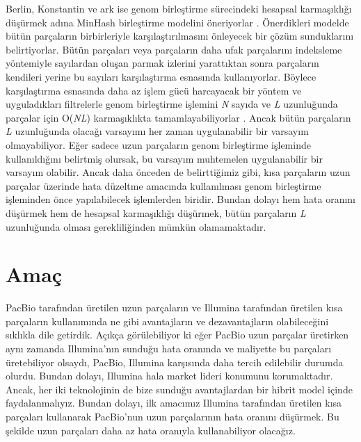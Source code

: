 Berlin, Konstantin ve ark ise genom birleştirme sürecindeki hesapsal karmaşıklığı düşürmek adına MinHash birleştirme modelini öneriyorlar \cite{Berlin2015}. Önerdikleri modelde bütün parçaların birbirleriyle karşılaştırılmasını önleyecek bir çözüm sunduklarını belirtiyorlar. Bütün parçaları veya parçaların daha ufak parçalarını indeksleme yöntemiyle sayılardan oluşan parmak izlerini yarattıktan sonra parçaların kendileri yerine bu sayıları karşılaştırma esnasında kullanıyorlar. Böylece karşılaştırma esnasında daha az işlem gücü harcayacak bir yöntem ve uyguladıkları filtrelerle genom birleştirme işlemini \textit{N} sayıda ve \textit{L} uzunluğunda parçalar için O(\textit{N}\textit{L}) karmaşıklıkta tamamlayabiliyorlar \cite{Berlin2015}. Ancak bütün parçaların \textit{L} uzunluğunda olacağı varsayımı her zaman uygulanabilir bir varsayım olmayabiliyor. Eğer sadece uzun parçaların genom birleştirme işleminde kullanıldığını belirtmiş olursak, bu varsayım muhtemelen uygulanabilir bir varsayım olabilir. Ancak daha önceden de belirttiğimiz gibi, kısa parçaların uzun parçalar üzerinde hata düzeltme amacında kullanılması genom birleştirme işleminden önce yapılabilecek işlemlerden biridir. Bundan dolayı hem hata oranını düşürmek hem de hesapsal karmaşıklığı düşürmek, bütün parçaların \textit{L} uzunluğunda olması gerekliliğinden mümkün olamamaktadır.

\section{Amaç}

PacBio tarafından üretilen uzun parçaların ve Illumina tarafından üretilen kısa parçaların kullanımında ne gibi avantajların ve dezavantajların olabileceğini sıklıkla dile getirdik. Açıkça görülebiliyor ki eğer PacBio uzun parçalar üretirken aynı zamanda Illumina'nın sunduğu hata oranında ve maliyette bu parçaları üretebiliyor olsaydı, PacBio, Illumina karşısında daha tercih edilebilir durumda olurdu. Bundan dolayı, Illumina hala market lideri konumunu korumaktadır. Ancak, her iki teknolojinin de bize sunduğu avantajlardan bir hibrit model içinde faydalanmalıyız. Bundan dolayı, ilk amacımız Illumina tarafından üretilen kısa parçaları kullanarak PacBio'nun uzun parçalarının hata oranını düşürmek. Bu şekilde uzun parçaları daha az hata oranıyla kullanabiliyor olacağız.

